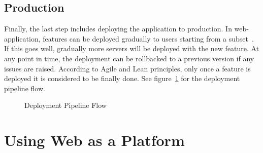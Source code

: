 \documentclass[english]{tktltiki2}
\begin{document}
\subsection{Production}

Finally, the last step includes deploying the application to production. In web-application, features can be deployed gradually to users starting from a subset~\cite{Bos12}. If this goes well, gradually more servers will be deployed with the new feature. At any point in time, the deployment can be rollbacked to a previous version if any issues are raised. According to Agile and Lean principles, only once a feature is deployed it is considered to be finally done. See figure~\ref{figure:deployment-pipeline-flow} for the deployment pipeline flow.

\begin{figure}[h!]

    \vspace{1cm}
    \centering


    \caption{Deployment Pipeline Flow}
    \label{figure:deployment-pipeline-flow}

\end{figure}


\section{Using Web as a Platform}
\end{document}
